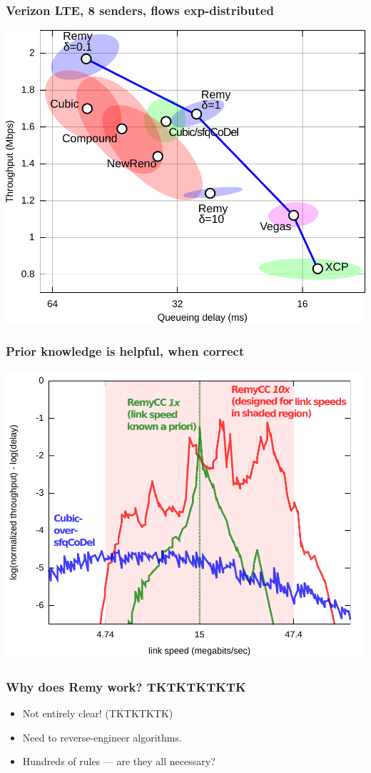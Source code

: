 \documentclass[svgnames]{beamer}
\begin{document}
\begin{frame}
\frametitle{Verizon LTE, 8 senders, flows exp-distributed}

\noindent \includegraphics[width=8.5 cm]{vzw-8-final.pdf}

\end{frame}

\begin{frame}
\frametitle{Prior knowledge is helpful, when correct}

\noindent \includegraphics[width=8.5 cm]{spec2.pdf}

\end{frame}

\begin{frame}
\frametitle{Why does Remy work? TKTKTKTKTK}

\begin{itemize}
\item Not entirely clear! (TKTKTKTK)

\item Need to reverse-engineer algorithms.

\item Hundreds of rules --- are they all necessary?
\end{itemize}

\end{frame}
\end{document}

